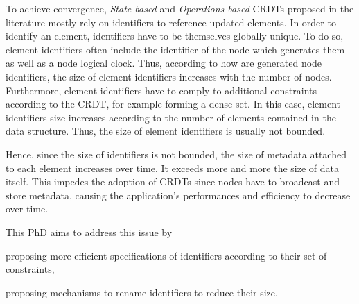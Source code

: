\documentclass{article}
\begin{document}
To achieve convergence, \emph{State-based} and \emph{Operations-based} \acp{CRDT} proposed in the literature mostly rely on identifiers to reference updated elements.
In order to identify an element, identifiers have to be themselves globally unique.
To do so, element identifiers often include the identifier of the node which generates them as well as a node logical clock.
Thus, according to how are generated node identifiers, the size of element identifiers increases with the number of nodes.
Furthermore, element identifiers have to comply to additional constraints according to the \ac{CRDT}, for example forming a dense set\cite{AndreCollaborateCom2013}.
In this case, element identifiers size increases according to the number of elements contained in the data structure.
Thus, the size of element identifiers is usually not bounded.



Hence, since the size of identifiers is not bounded, the size of metadata attached to each element increases over time.
It exceeds more and more the size of data itself.
This impedes the adoption of \acp{CRDT} since nodes have to broadcast and store metadata, causing the application's performances and efficiency to decrease over time.

This PhD aims to address this issue by
\begin{enumerate*}
  \item proposing more efficient specifications of identifiers according to their set of constraints,
  \item proposing mechanisms to rename identifiers to reduce their size.
\end{enumerate*}




\end{document}
